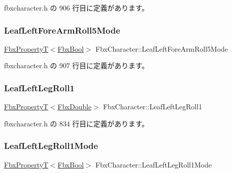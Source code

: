 fbxcharacter.\+h の 906 行目に定義があります。

\mbox{\label{class_fbx_character_a56d039ed5967f3dc586655aeed17f7de}} 
\subsubsection{\texorpdfstring{Leaf\+Left\+Fore\+Arm\+Roll5\+Mode}{LeafLeftForeArmRoll5Mode}}
{\footnotesize\ttfamily \hyperlink{class_fbx_property_t}{Fbx\+PropertyT}$<$\hyperlink{fbxtypes_8h_a92e0562b2fe33e76a242f498b362262e}{Fbx\+Bool}$>$ Fbx\+Character\+::\+Leaf\+Left\+Fore\+Arm\+Roll5\+Mode}



 fbxcharacter.\+h の 907 行目に定義があります。

\mbox{\label{class_fbx_character_abce416295080a2639984a3185fd941fb}} 
\subsubsection{\texorpdfstring{Leaf\+Left\+Leg\+Roll1}{LeafLeftLegRoll1}}
{\footnotesize\ttfamily \hyperlink{class_fbx_property_t}{Fbx\+PropertyT}$<$\hyperlink{fbxtypes_8h_a171e72a1c46fc15c1a6c9c31948c1c5b}{Fbx\+Double}$>$ Fbx\+Character\+::\+Leaf\+Left\+Leg\+Roll1}



 fbxcharacter.\+h の 834 行目に定義があります。

\mbox{\label{class_fbx_character_a30ebf3e0212bc7339ec5a0131dbec5d5}} 
\subsubsection{\texorpdfstring{Leaf\+Left\+Leg\+Roll1\+Mode}{LeafLeftLegRoll1Mode}}
{\footnotesize\ttfamily \hyperlink{class_fbx_property_t}{Fbx\+PropertyT}$<$\hyperlink{fbxtypes_8h_a92e0562b2fe33e76a242f498b362262e}{Fbx\+Bool}$>$ Fbx\+Character\+::\+Leaf\+Left\+Leg\+Roll1\+Mode}



